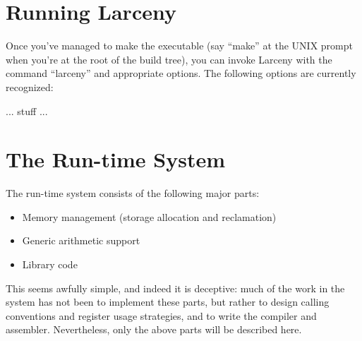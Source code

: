 \section{Running Larceny}

Once you've managed to make the executable (say ``make'' at the UNIX prompt
when you're at the root of the build tree), you can invoke Larceny with
the command ``larceny'' and appropriate options. The following options are
currently recognized:

... stuff ...

% 
% 
% 

\section{The Run-time System}

The run-time system consists of the following major parts:

\begin{itemize}
\item Memory management (storage allocation and reclamation)
\item Generic arithmetic support
\item Library code
\end{itemize}

This seems awfully simple, and indeed it is deceptive: much of the
work in the system has not been to implement these parts, but rather
to design calling conventions and register usage strategies, and to
write the compiler and assembler. Nevertheless, only the above parts
will be described here.


